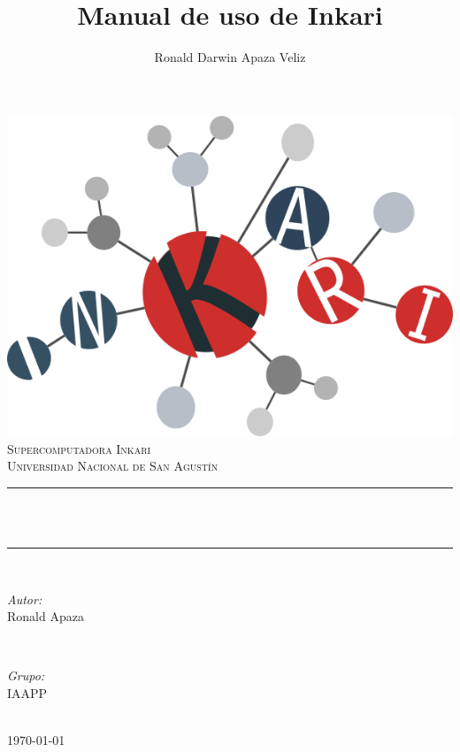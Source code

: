 \documentclass[a4paper,11pt]{article}
\title{Manual de uso de Inkari}
\author{Ronald Darwin Apaza Veliz}
\begin{document}
\begin{titlepage}
	\centering
    \vspace*{0.5 cm}
    \includegraphics[scale = 0.55]{logo-inkari}\\[1.0 cm]	%
    \textsc{\LARGE \newline\newline Supercomputadora Inkari}\\[2.0 cm]	%
	\textsc{\Large Universidad Nacional de San Agustín}\\[0.5 cm]				%
	\rule{\linewidth}{0.2 mm} \\[0.4 cm]
	{ \huge \bfseries \thetitle}\\
	\rule{\linewidth}{0.2 mm} \\[1.5 cm]
	
	\begin{minipage}{0.5\textwidth}
		\begin{flushleft}
            \large
			\emph{Autor:}\\
			Ronald Apaza
        \end{flushleft}
        \end{minipage}
        ~
        \begin{minipage}{0.4\textwidth}    
			\begin{flushright}
                \large
                \emph{Grupo:} \\
                IAAPP
            \end{flushright}
	\end{minipage}\\[2 cm]
	
    \today

\end{titlepage}
\end{document}
